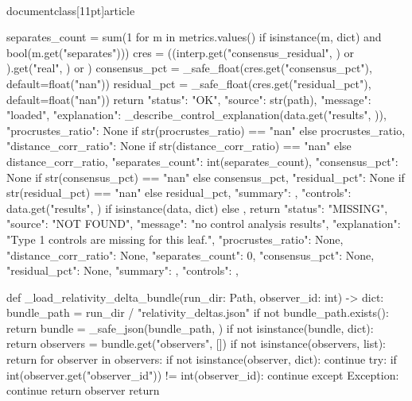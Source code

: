 \\documentclass[11pt]{article}
\begin{document}
\begin{CodeBlock}
{        separates_count = sum(1 for m in metrics.values() if isinstance(m, dict) and bool(m.get("separates")))
        cres = ((interp.get("consensus_residual", {}) or {}).get("real", {}) or {})
        consensus_pct = _safe_float(cres.get("consensus_pct"), default=float("nan"))
        residual_pct = _safe_float(cres.get("residual_pct"), default=float("nan"))
        return {
            "status": "OK",
            "source": str(path),
            "message": "loaded",
            "explanation": _describe_control_explanation(data.get("results", {})),
            "procrustes_ratio": None if str(procrustes_ratio) == "nan" else procrustes_ratio,
            "distance_corr_ratio": None if str(distance_corr_ratio) == "nan" else distance_corr_ratio,
            "separates_count": int(separates_count),
            "consensus_pct": None if str(consensus_pct) == "nan" else consensus_pct,
            "residual_pct": None if str(residual_pct) == "nan" else residual_pct,
            "summary": {},
            "controls": data.get("results", {}) if isinstance(data, dict) else {},
        }
    return {
        "status": "MISSING",
        "source": "NOT FOUND",
        "message": "no control analysis results",
        "explanation": "Type 1 controls are missing for this leaf.",
        "procrustes_ratio": None,
        "distance_corr_ratio": None,
        "separates_count": 0,
        "consensus_pct": None,
        "residual_pct": None,
        "summary": {},
        "controls": {},
    }


def _load_relativity_delta_bundle(run_dir: Path, observer_id: int) -> dict:
    bundle_path = run_dir / "relativity_deltas.json"
    if not bundle_path.exists():
        return {}
    bundle = _safe_json(bundle_path, {})
    if not isinstance(bundle, dict):
        return {}
    observers = bundle.get("observers", [])
    if not isinstance(observers, list):
        return {}
    for observer in observers:
        if not isinstance(observer, dict):
            continue
        try:
            if int(observer.get("observer_id")) != int(observer_id):
                continue
        except Exception:
            continue
        return observer
    return {}


}
\end{CodeBlock}
\end{document}
